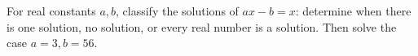 For real constants $a,b$, classify the solutions of $ax-b=x$: determine when there is one solution, no solution, or every real number is a solution. Then solve the case $a=3,b=56$.
